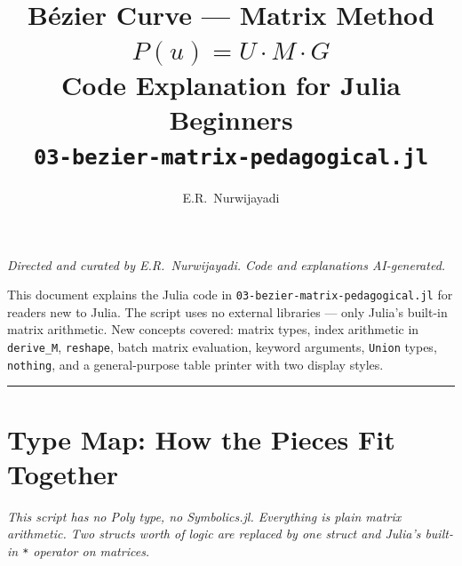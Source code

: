 \documentclass[12pt, a4paper]{article}
\title{%
  \vspace{1cm}
  {\LARGE\bfseries B\'ezier Curve --- Matrix Method}\\[0.4em]
  {\large $P(u) = U \cdot M \cdot G$}\\[0.4em]
  {\large Code Explanation for Julia Beginners}\\[0.4em]
  {\normalsize\texttt{03-bezier-matrix-pedagogical.jl}}
}
\author{E.R.\ Nurwijayadi}
\date{\DTMtoday}
\newcommand{\cd}[1]{\texttt{#1}}
\begin{document}

\maketitle
\thispagestyle{empty}

\begin{center}
\textit{Directed and curated by E.R.\ Nurwijayadi.
Code and explanations AI-generated.}
\end{center}

\begin{center}
\begin{minipage}{0.85\textwidth}
\small
This document explains the Julia code in
\cd{03-bezier-matrix-pedagogical.jl} for readers new to Julia.
The script uses no external libraries --- only Julia's built-in
matrix arithmetic.
New concepts covered: matrix types, index arithmetic in
\cd{derive\_M}, \cd{reshape}, batch matrix evaluation,
keyword arguments, \cd{Union} types, \cd{nothing}, and
a general-purpose table printer with two display styles.
\end{minipage}
\end{center}

\vspace{1em}\hrule\vspace{1.5em}
\tableofcontents
\newpage


\section{Type Map: How the Pieces Fit Together}

\textit{This script has no Poly type, no Symbolics.jl.
Everything is plain matrix arithmetic.
Two structs worth of logic are replaced by one struct and
Julia's built-in \cd{*} operator on matrices.}

\bigskip

\end{document}
